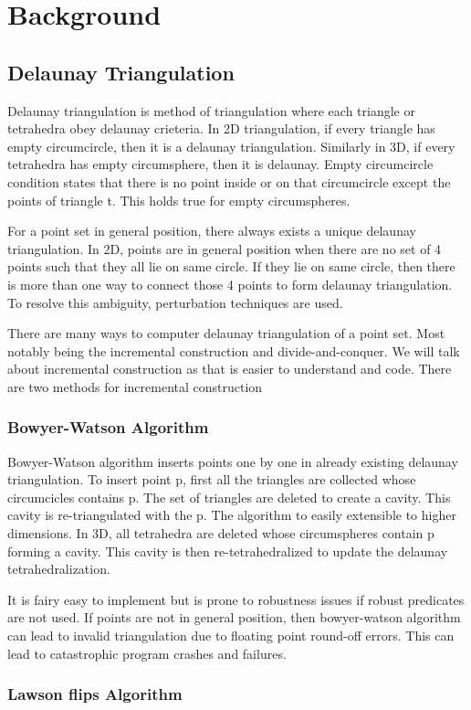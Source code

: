 \chapter{Background}
\section{Delaunay Triangulation}
Delaunay triangulation is method of triangulation where each triangle or tetrahedra obey delaunay crieteria. In 2D triangulation, if every triangle has empty circumcircle, then it is a delaunay triangulation. Similarly in 3D, if every tetrahedra has empty circumsphere, then it is delaunay. Empty circumcircle condition states that there is no point inside or on that circumcircle except the points of triangle t. This holds true for empty circumspheres.

For a point set in general position, there always exists a unique delaunay triangulation. In 2D, points are in general position when there are no set of 4 points such that they all lie on same circle. If they lie on same circle, then there is more than one way to connect those 4 points to form delaunay triangulation. To resolve this ambiguity, perturbation techniques are used.

There are many ways to computer delaunay triangulation of a point set. Most notably being the incremental construction and divide-and-conquer. We will talk about incremental construction as that is easier to understand and code. There are two methods for incremental construction

\subsection{Bowyer-Watson Algorithm}
Bowyer-Watson algorithm inserts points one by one in already existing delaunay triangulation. To insert point p, first all the triangles are collected whose circumcicles contains p. The set of triangles are deleted to create a cavity. This cavity is re-triangulated with the p. The algorithm to easily extensible to higher dimensions. In 3D, all tetrahedra are deleted whose circumspheres contain p forming a cavity. This cavity is then re-tetrahedralized to update the delaunay tetrahedralization. 

It is fairy easy to implement but is prone to robustness issues if robust predicates are not used. If points are not in general position, then bowyer-watson algorithm can lead to invalid triangulation due to floating point round-off errors. This can lead to catastrophic program crashes and failures.

\subsection{Lawson flips Algorithm}





